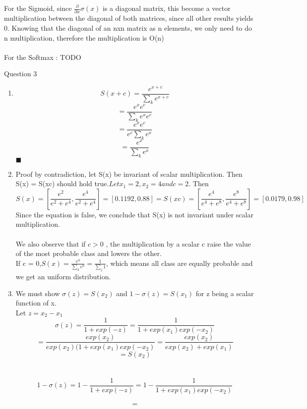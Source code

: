 \documentclass{article}
\begin{document}
\begin{enumerate}
	For the Sigmoid, since $\frac{\partial }{\partial x} \sigma(x)$ is a diagonal matrix, this become a vector multiplication between the diagonal of both matrices, since all other results yields 0.
	Knowing that the diagonal of an nxn matrix as n elements, we only need to do n multiplication, therefore the multiplication is O(n)\\ \\

	For the Softmax : TODO\\



    \vspace{0.5cm}
   
  \end{enumerate}
  
\vspace{1cm}
 Question 3 \\

\begin{enumerate}
     \item 
	$$ S(x+c) = \frac{e^{x+c}}{\sum_k e^{x + c}}$$ $$ = \frac{e^x e^c}{\sum_k e^{x} e^{c}}$$ $$= \frac{e^x e^c}{e^{c}\sum_k e^{x}}$$ $$ =  \frac{e^x}{\sum_k e^{x}}$$
	$\blacksquare$

    \item 
	Proof by contradiction, let S(x) be invariant of scalar multiplication. Then S(x) = S(xc) should hold true.$ Let x_1 = 2 , x_2 = 4 and c = 2$. Then 
	$$ S(x) = [\frac{e^2}{e^2 + e^4}, \frac{e^4}{e^2 + e^4}]  = [0.1192,0.88] = S(xc) =  [\frac{e^4}{e^4 + e^8}, \frac{e^8}{e^4 + e^8}] = [0.0179,0.98]$$
	Since the equation is false, we conclude that S(x) is not invariant under scalar multiplication.\\ \\
	We also observe that if $c > 0$ , the multiplication by a scalar c raise the value of the most probable class and lowers the other.\\
	If c = 0,$ S(x) = \frac{e^0}{\sum_k e^0} = \frac{1}{\sum_j 1}$, which means all class are equally probable and we get an uniform distribution.\\

    \item
	We must show $\sigma(z) = S(x_2)$ and $1 - \sigma(z) = S(x_1)$ for z being a scalar function of x.\\

	Let $z = x_2 - x_1$\\
	$$\sigma(z) = \frac{1}{1 + exp(-z)} = \frac{1}{1 + exp(x_1)exp(-x_2)}$$ $$ = \frac{exp(x_2)}{exp(x_2)( 1 + exp(x_1)exp(-x_2)} = \frac{exp(x_2)}{exp(x_2) + exp(x_1)} $$ $$= S(x_2)$$\\ \\

	$$1 - \sigma(z) = 1 - \frac{1}{1 + exp(-z)} = 1 - \frac{1}{1 + exp(x_1)exp(-x_2)}$$\\
	$$ = $$
	
    \vspace{0.5cm}
\end{enumerate}
\end{document}

